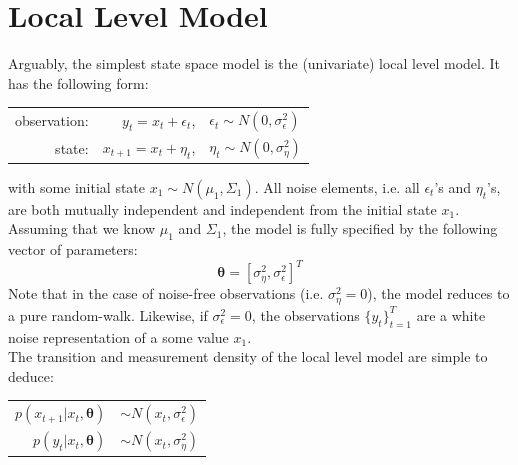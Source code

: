 \documentclass[11pt, oneside]{scrreprt}   	%
\begin{document}
\section{Local Level Model}
Arguably, the simplest state space model is the (univariate) local level model. It has the following form:

\begin{center}
\begin{tabular}{ r r l }
  observation: & $y_t = x_t + \epsilon_t$, & $\epsilon_t \sim N(0,\sigma_{\epsilon}^2)$ \\
  state: & $x_{t+1} = x_t + \eta_t$, & $\eta_t \sim N(0,\sigma_{\eta}^2)$ \\
\end{tabular}
\end{center}
\bigskip
with some initial state $x_1 \sim N(\mu_1, \Sigma_1)$. All noise elements, i.e. all $\epsilon_t$'s and $\eta_t$'s, are both mutually independent and independent from the initial state $x_1$. Assuming that we know $\mu_1$ and $\Sigma_1$, the model is fully specified by the following vector of parameters:
$$
\boldsymbol{\theta} = [\sigma_{\eta}^2,  \sigma_{\epsilon}^2]^T
$$
Note that in the case of noise-free observations (i.e. $\sigma_{\eta}^2 = 0$), the model reduces to a pure random-walk. Likewise, if $\sigma_{\epsilon}^2 = 0$, the observations $\{y_t\}_{t=1}^T$ are a white noise representation of a some value $x_1$.\\
The transition and measurement density of the local level model are simple to deduce:
\begin{center}
\begin{tabular}{ r l }
  $p(x_{t+1} | x_t, \boldsymbol{\theta})$ & $\sim N(x_t,\sigma_{\epsilon}^2)$ \\
  $p(y_t | x_t, \boldsymbol{\theta})$ & $\sim N(x_t,\sigma_{\eta}^2)$ \\
\end{tabular}
\end{center}
\bigskip

\end{document}
